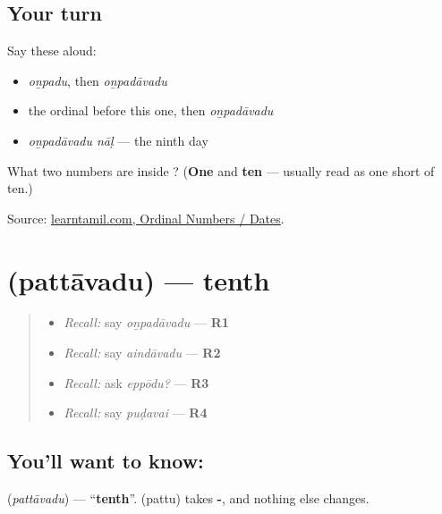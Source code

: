 \subsection*{Your turn}
Say these aloud:

\begin{itemize}
\raggedright
  \item \emph{oṉpadu}, then \emph{oṉpadāvadu}
  \item the ordinal before this one, then \emph{oṉpadāvadu}
  \item \emph{oṉpadāvadu nāḷ} — the ninth day
\end{itemize}

\begin{tcolorbox}[breakable,colback=teal!4,colframe=teal!35!black,title={Before you move on}]
What two numbers are inside ? (\textbf{One} and \textbf{ten} — usually read as one short of ten.)

Source: \href{https://www.learntamil.com/part1/ch02/ordinal-numbers-dates/}{learntamil.com, Ordinal Numbers / Dates}.
\end{tcolorbox}
\section[\texorpdfstring{\ta{பத்தாவது} (pattāvadu)}{பத்தாவது (pattāvadu)}]{ (pattāvadu) — tenth}

\label{lesson:TA-C83-tenth}



\begin{quote}
\begin{itemize}
\raggedright
  \item \emph{Recall:} say \emph{oṉpadāvadu} — \textbf{R1}
  \item \emph{Recall:} say \emph{aindāvadu} — \textbf{R2}
  \item \emph{Recall:} ask \emph{eppōdu?} — \textbf{R3}
  \item \emph{Recall:} say \emph{puḍavai} — \textbf{R4}
\end{itemize}
\end{quote}

\subsection*{You'll want to know: }
\textbf{} (\emph{pattāvadu}) — \textquotedblleft{}\textbf{tenth}\textquotedblright{}. \textbf{} (pattu) takes \textbf{-}, and nothing else changes.


